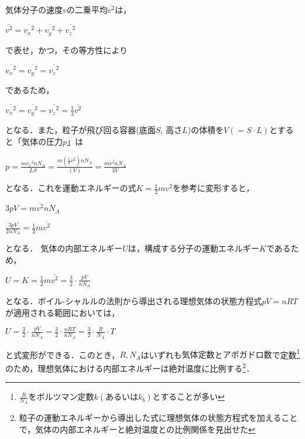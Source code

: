 気体分子の速度\(v\)の二乗平均\(\overline{v^2}\)は，

\(\overline{v^2}=\overline{{v_x}^2}+\overline{{v_y}^2}+\overline{{v_z}^2}\)

で表せ，かつ，その等方性により

\(\overline{{v_x}^2}=\overline{{v_y}^2}=\overline{{v_z}^2}\)

であるため，

\(\overline{{v_x}^2}=\overline{{v_y}^2}=\overline{{v_z}^2}=\frac{1}{3}\overline{v^2}\)

となる．また，粒子が飛び回る容器(底面\(S\),
高さ\(L\))の体積を\(V(={S}\cdot{L})\)とすると「気体の圧力\(p\)」は

\(p=\frac{m{{v_x}^2}n{N_A}}{LS}=\frac{m({\frac{1}{3}\overline{v^2}})n{N_A}}{(V)}=\frac{m\overline{v^2}n{N_A}}{3V}\)

となる．これを運動エネルギーの式\(K=\frac{1}{2}m{v}^2\)を参考に変形すると，

\(3pV=m\overline{v^2}n{N_A}\)

\(\frac{3pV}{2n{N_A}}=\frac{1}{2}m\overline{v^2}\)

となる．
気体の内部エネルギー\(U\)は，構成する分子の運動エネルギー\(K\)であるため，

\(U=K=\frac{1}{2}m\overline{v^2}=\frac{3}{2}\cdot\frac{pV}{n{N_A}}\)

となる．ボイル-シャルルの法則から導出される理想気体の状態方程式\(pV=nRT\)が適用される範囲においては，

\(U=\frac{3}{2}\cdot\frac{pV}{n{N_A}}=\frac{3}{2}\cdot\frac{nRT}{n{N_A}}=\frac{3}{2}\cdot\frac{R}{N_A}\cdot{T}\)

と式変形ができる．このとき，\(R, N_A\)はいずれも\(気体定数\)と\(アボガドロ数\)で定数\footnote{\(\frac{R}{N_A}\)をボルツマン定数\(k(あるいは{k_b})\)とすることが多い}のため，理想気体における内部エネルギーは絶対温度に比例する\footnote{粒子の運動エネルギーから導出した式に理想気体の状態方程式を加えることで，気体の内部エネルギーと絶対温度との比例関係を見出せた}．
